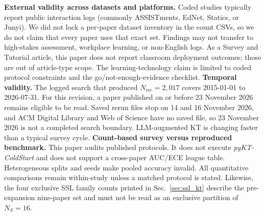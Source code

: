 \documentclass[lettersize,journal]{IEEEtran}
\begin{document}
\textbf{External validity across datasets and platforms.} Coded studies typically report public interaction logs (commonly ASSISTments, EdNet, Statics, or Junyi). We did not lock a per-paper dataset inventory in the count CSVs, so we do not claim that every paper uses that exact set. Findings may not transfer to high-stakes assessment, workplace learning, or non-English logs. As a Survey and Tutorial article, this paper does not report classroom deployment outcomes; those are out of article-type scope. The learning-technology claim is limited to coded protocol constraints and the go/not-enough-evidence checklist.
\textbf{Temporal validity.} The logged search that produced $N_{\mathrm{rec}}=2{,}017$ covers 2015-01-01 to 2026-07-31. For this revision, a paper published on or before 23 November 2026 remains eligible to be read. Saved rerun files stop on 14 and 16 November 2026, and ACM Digital Library and Web of Science have no saved file, so 23 November 2026 is not a completed search boundary. LLM-augmented KT is changing faster than a typical survey cycle.
\textbf{Count-based survey versus reproduced benchmark.} This paper audits published protocols. It does not execute \emph{pyKT-ColdStart} and does not support a cross-paper AUC/ECE league table. Heterogeneous splits and seeds make pooled accuracy invalid. All quantitative comparisons remain within-study unless a matched protocol is stated. Likewise, the four exclusive SSL family counts printed in Sec.~\ref{sec:ssl_kt} describe the pre-expansion nine-paper set and must not be read as an exclusive partition of $N_S=16$.
\end{document}
